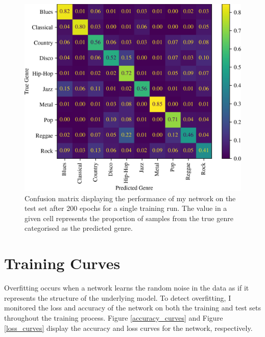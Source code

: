\documentclass[conference]{IEEEtran}
\begin{document}
\begin{figure}[htbp]
    \centerline{\includegraphics[width=\columnwidth]{cm.png}}
    \caption{
        Confusion matrix displaying the performance of my network on the test set after 200 epochs for a single training run.    
        The value in a given cell represents the proportion of samples from the true genre categorised as the predicted genre.
    }
    \label{confusion_matrix}
\end{figure}

\section{Training Curves}

Overfitting occurs when a network learns the random noise in the data as if it represents the structure of the underlying model.
To detect overfitting, I monitored the loss and accuracy of the network on both the training and test sets throughout the training process.
Figure \ref{accuracy_curves} and Figure \ref{loss_curves} display the accuracy and loss curves for the network, respectively.
\end{document}
